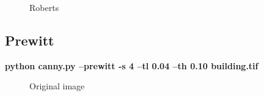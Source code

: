     \begin{figure}[!htb]\centering
        \begin{minipage}{0.8\textwidth}
            \caption{\small{Roberts}}\label{diagram:roberts}
        \end{minipage}
    \end{figure}

\subsection{Prewitt}

    \textbf{python canny.py --prewitt -s 4 --tl 0.04 --th 0.10 building.tif}

    \begin{figure}[!htb]\centering
        \begin{minipage}{0.8\textwidth}
            \caption{\small{Original image}}\label{diagram:building}
        \end{minipage}
    \end{figure}


